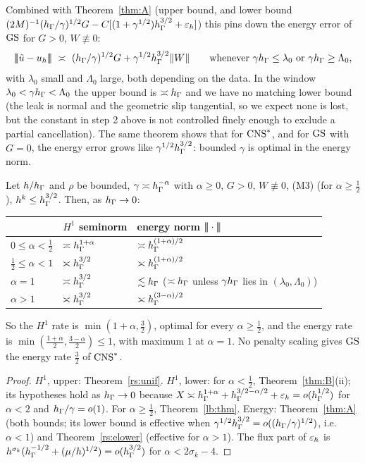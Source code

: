 Combined with Theorem~\ref{thm:A} (upper bound, and lower bound $(2M)^{-1}(h_\Gamma/\gamma)^{1/2}G-C[(1+\gamma^{1/2})h_\Gamma^{3/2}+\varepsilon_h]$) this pins down the energy error of $\mathrm{GS}$ for $G>0$, $W\not\equiv0$:
\[
\tnorm{\ut-u_h}\ \asymp\ (\hG/\gamma)^{1/2}G+\gamma^{1/2}\hG^{3/2}\norm W\qquad\text{whenever }\gamma\hG\le\lambda_0\text{ or }\gamma\hG\ge\Lambda_0,
\]
with $\lambda_0$ small and $\Lambda_0$ large, both depending on the data. In the window $\lambda_0<\gamma h_\Gamma<\Lambda_0$ the upper bound is $\asymp h_\Gamma$ and we have no matching lower bound (the leak is normal and the geometric slip tangential, so we expect none is lost, but the constant in step 2 above is not controlled finely enough to exclude a partial cancellation). The same theorem shows that for $\mathrm{CNS}^\ast$, and for $\mathrm{GS}$ with $G=0$, the energy error grows like $\gamma^{1/2}h_\Gamma^{3/2}$: bounded $\gamma$ is optimal in the energy norm.

\begin{corollary}\label{rs:rates}
Let $h/h_\Gamma$ and $\rho$ be bounded, $\gamma\asymp h_\Gamma^{-\alpha}$ with $\alpha\ge0$, $G>0$, $W\not\equiv0$, (M3) (for $\alpha\ge\frac12$), $h^k\le h_\Gamma^{3/2}$. Then, as $h_\Gamma\to0$:
\begin{center}
\begin{tabular}{lll}
\toprule
& $H^1$ seminorm & energy norm $|\!|\!|\cdot|\!|\!|$\\
\midrule
$0\le\alpha<\frac12$ & $\asymp h_\Gamma^{1+\alpha}$ & $\asymp h_\Gamma^{(1+\alpha)/2}$\\
$\frac12\le\alpha<1$ & $\asymp h_\Gamma^{3/2}$ & $\asymp h_\Gamma^{(1+\alpha)/2}$\\
$\alpha=1$ & $\asymp h_\Gamma^{3/2}$ & $\lesssim h_\Gamma$ ($\asymp h_\Gamma$ unless $\gamma h_\Gamma$ lies in $(\lambda_0,\Lambda_0)$)\\
$\alpha>1$ & $\asymp h_\Gamma^{3/2}$ & $\asymp h_\Gamma^{(3-\alpha)/2}$\\
\bottomrule
\end{tabular}
\end{center}
So the $H^1$ rate is $\min(1+\alpha,\frac32)$, optimal for every $\alpha\ge\frac12$, and the energy rate is $\min(\frac{1+\alpha}2,\frac{3-\alpha}2)\le1$, with maximum $1$ at $\alpha=1$. No penalty scaling gives $\mathrm{GS}$ the energy rate $\frac32$ of $\mathrm{CNS}^\ast$.
\end{corollary}

\begin{proof}
$H^1$, upper: Theorem~\ref{rs:unif}. $H^1$, lower: for $\alpha<\frac12$, Theorem~\ref{thm:B}(ii); its hypotheses hold as $h_\Gamma\to0$ because $X\asymp h_\Gamma^{1+\alpha}+h_\Gamma^{3/2-\alpha/2}+\varepsilon_h=o(h_\Gamma^{1/2})$ for $\alpha<2$ and $h_\Gamma/\gamma=o(1)$. For $\alpha\ge\frac12$, Theorem~\ref{lb:thm}. Energy: Theorem~\ref{thm:A} (both bounds; its lower bound is effective when $\gamma^{1/2}h_\Gamma^{3/2}=o((h_\Gamma/\gamma)^{1/2})$, i.e.\ $\alpha<1$) and Theorem~\ref{rs:elower} (effective for $\alpha>1$). The flux part of $\varepsilon_h$ is $h^{\sigma_k}(h_\Gamma^{-1/2}+(\mu/h)^{1/2})=o(h_\Gamma^{3/2})$ for $\alpha<2\sigma_k-4$.
\end{proof}

